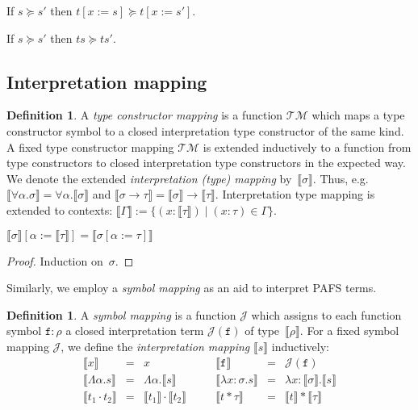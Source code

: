 \documentclass[a4paper,UKenglish,cleveref,autoref,numberwithinsect]{lipics-v2019}
\theoremstyle{definition}
\newtheorem{defn}[theorem]{Definition}
\newcommand{\arrtype}{\rightarrow}
\newcommand{\quant}[2]{\forall #1.#2}
\newcommand{\app}[2]{#1 \cdot #2}
\newcommand{\tapp}[2]{#1 * #2}
\newcommand{\subst}[2]{#1:=#2}
\newcommand{\abs}[2]{\lambda #1.#2}
\newcommand{\tabs}[2]{\Lambda #1.#2}
\newcommand{\typeinterpret}[1]{\llbracket #1 \rrbracket}
\newcommand{\interpret}[1]{\llbracket #1 \rrbracket}
\newcommand{\itp}[1]{\llbracket #1 \rrbracket}
\newcommand{\Typemap}{\mathcal{T\!M}}
\newcommand{\Termmap}{\mathcal{J}}
\begin{document}
\begin{lemma}\label{lem_succeq_subst}
  If $s \succeq s'$ then $t[\subst{x}{s}] \succeq t[\subst{x}{s'}]$.
\end{lemma}

\begin{corollary}\label{cor_app_wm}
  If $s \succeq s'$ then $t s \succeq t s'$.
\end{corollary}

\subsection{Interpretation mapping}

\begin{defn}
  A \emph{type constructor mapping} is a function $\Typemap$ which
  maps a type constructor symbol to a closed interpretation type
  constructor of the same kind. A fixed type constructor mapping
  $\Typemap$ is extended inductively to a function from type
  constructors to closed interpretation type constructors in the
  expected way. We denote the extended \emph{interpretation (type)
    mapping} by~$\typeinterpret{\sigma}$. Thus,
  e.g.~$\typeinterpret{\quant{\alpha}{\sigma}} =
  \quant{\alpha}{\typeinterpret{\sigma}}$ and $\typeinterpret{\sigma
    \arrtype \tau} = \typeinterpret{\sigma} \arrtype
  \typeinterpret{\tau}$. Interpretation type mapping is extended to
  contexts: \( \itp{\Gamma} := \{ (x : \typeinterpret{\tau}) \mid (x :
  \tau) \in \Gamma \}.  \)
\end{defn}

\begin{lemma}\label{lem:substitutioninterpret:types}
  $\typeinterpret{\sigma}[\alpha:=\typeinterpret{\tau}] =
  \typeinterpret{\sigma[\alpha:=\tau]}$
\end{lemma}

\begin{proof}
  Induction on~$\sigma$.
\end{proof}

Similarly, we employ a \emph{symbol mapping} as an aid to interpret
PAFS terms.

\begin{defn}
  A \emph{symbol mapping} is a function $\Termmap$ which assigns to
  each function symbol $\mathtt{f} : \rho$ a closed interpretation
  term $\Termmap(\mathtt{f})$ of type~$\typeinterpret{\rho}$. For a
  fixed symbol mapping $\Termmap$, we define the \emph{interpretation
    mapping} $\interpret{s}$ inductively:
  \[
    \begin{array}{rclcrcl}
      \interpret{x} & = & x &\quad&
      \interpret{\mathtt{f}} &=& \Termmap(\mathtt{f}) \\
      \interpret{\tabs{\alpha}{s}} & = & \tabs{\alpha}{\interpret{s}} &\quad&
      \interpret{\abs{x:\sigma}{s}} & = & \abs{x:\typeinterpret{\sigma}}{
                                          \interpret{s}} \\
      \interpret{\app{t_1}{t_2}} &=& \app{\interpret{t_1}}{\interpret{t_2}} &\quad&
      \interpret{\tapp{t}{\tau}} &=& \tapp{\interpret{t}}{\typeinterpret{\tau}}
    \end{array}
  \]
\end{defn}
\end{document}
